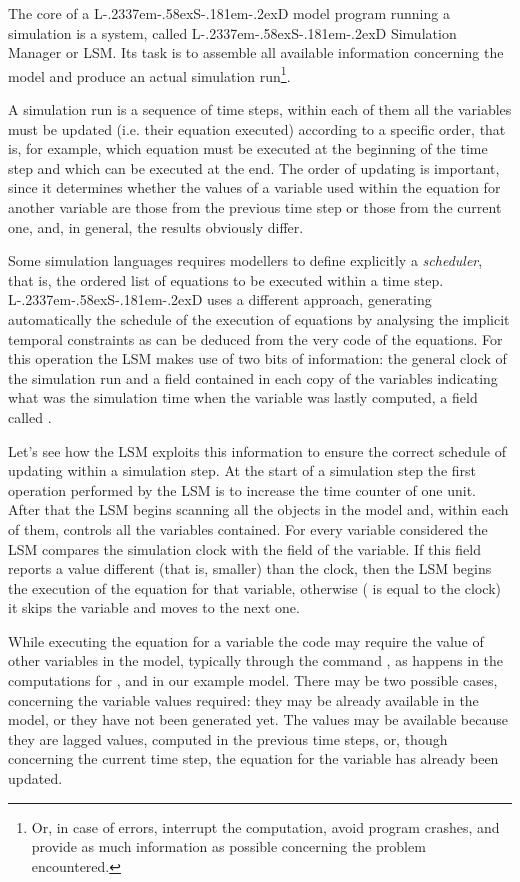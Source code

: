 \documentclass [11pt,a4paper] {book}
\def\LsD{{L\kern-.2337em\lower-.58ex\hbox{S}\kern-.181em\lower-.2ex\hbox{D}}\xspace}
\begin{document}
The core of a \LsD model program running a simulation is a system, called \LsD Simulation Manager or LSM. Its task is to assemble all available information concerning the model and produce an actual simulation run\footnote{Or, in case of errors, interrupt the computation, avoid program crashes, and provide as much information as possible concerning the problem encountered.}.

A simulation run is a sequence of time steps, within each of them all the variables must be updated (i.e. their equation executed) according to a specific order, that is, for example, which equation must be executed at the beginning of the time step and which can be executed at the end. The order of updating is important, since it determines whether the values of a variable used within the equation for another variable are those from the previous time step or those from the current one, and, in general, the results obviously differ.

Some simulation languages requires modellers to define explicitly a \textit{scheduler}, that is, the ordered list of equations to be executed within a time step. \LsD uses a different approach, generating automatically the schedule of the execution of equations by analysing the implicit temporal constraints as can be deduced from the very code of the equations. For this operation the LSM makes use of two bits of information: the general clock of the simulation run and a field contained in each copy of the variables indicating what was the simulation time when the variable was lastly computed, a field called .

Let's see how the LSM exploits this information to ensure the correct schedule of updating within a simulation step. At the start of a simulation step the first operation performed by the LSM is to increase the time counter of one unit. After that the LSM begins scanning all the objects in the model and, within each of them, controls all the variables contained. For every variable considered the LSM compares the simulation clock with the field  of the variable. If this field reports a value different (that is, smaller) than the clock, then the LSM begins the execution of the equation for that variable, otherwise ( is equal to the clock) it skips the variable and moves to the next one.

While executing the equation for a variable the code may require the value of other variables in the model, typically through the command , as happens in the computations for ,  and  in our example model. There may be two possible cases, concerning the variable values required: they may be already available in the model, or they have not been generated yet. The values may be available because they are lagged values, computed in the previous time steps, or, though concerning the current time step, the equation for the variable has already been updated. 
\end{document}
